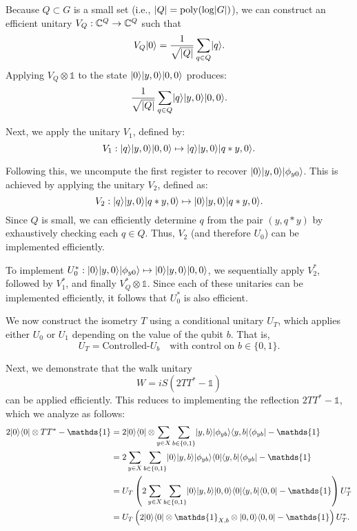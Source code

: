 \documentclass[11pt]{article}
\theoremstyle{definition}
\begin{document}
Because \( Q \subset G \) is a small set (i.e., \( \lvert Q\rvert = \operatorname{poly}(\log \lvert G\rvert) \)), we can construct an efficient unitary \( V_Q : \mathbb{C}^Q \to \mathbb{C}^Q \) such that
\[
V_Q \lvert0\rangle = \frac{1}{\sqrt{\lvert Q\rvert}} \sum_{q \in Q} \lvert q\rangle.
\]
Applying \( V_Q \otimes \mathds{1} \) to the state \( \lvert0\rangle \lvert y, 0\rangle \lvert0, 0\rangle \) produces:
\[
\frac{1}{\sqrt{\lvert Q\rvert}} \sum_{q \in Q} \lvert q\rangle \lvert y, 0\rangle \lvert0, 0\rangle.
\]

Next, we apply the unitary \( V_1 \), defined by:
\[
V_1 : \lvert q\rangle \lvert y, 0\rangle \lvert0, 0\rangle \mapsto \lvert q\rangle \lvert y, 0\rangle \lvert q * y, 0\rangle.
\]

Following this, we uncompute the first register to recover \( \lvert0\rangle \lvert y, 0\rangle \lvert\phi_{y0}\rangle \). This is achieved by applying the unitary \( V_2 \), defined as:
\[
V_2 : \lvert q\rangle \lvert y, 0\rangle \lvert q * y, 0\rangle \mapsto \lvert0\rangle \lvert y, 0\rangle \lvert q * y, 0\rangle.
\]
Since \( Q \) is small, we can efficiently determine \( q \) from the pair \( (y, q * y) \) by exhaustively checking each \( q \in Q \). Thus, \( V_2 \) (and therefore \( U_0 \)) can be implemented efficiently.


To implement \( U_0^* : \lvert0\rangle \lvert y, 0\rangle \lvert\phi_{y0}\rangle \mapsto \lvert0\rangle \lvert y, 0\rangle \lvert0, 0\rangle \), we sequentially apply \( V_2^* \), followed by \( V_1^* \), and finally \( V_Q^* \otimes \mathds{1} \). Since each of these unitaries can be implemented efficiently, it follows that \( U_0^* \) is also efficient.

We now construct the isometry \( T \) using a conditional unitary \( U_T \), which applies either \( U_0 \) or \( U_1 \) depending on the value of the qubit \( b \). That is,
\[
U_T = \text{Controlled-}U_b \quad \text{with control on } b \in \{0,1\}.
\]

Next, we demonstrate that the walk unitary
\[
W = iS(2TT^* - \mathds{1})
\]
can be applied efficiently. This reduces to implementing the reflection \( 2TT^* - \mathds{1} \), which we analyze as follows:
\begin{align*}
2\ket{0}\bra{0} \otimes TT^* - \mathds{1}
&= 2\ket{0}\bra{0} \otimes \sum_{y \in X} \sum_{b \in \{0,1\}} \ket{y,b} \ket{\phi_{yb}} \bra{y,b} \bra{\phi_{yb}} - \mathds{1} \\
&= 2\sum_{y \in X} \sum_{b \in \{0,1\}} \ket{0} \ket{y,b} \ket{\phi_{yb}} \bra{0} \bra{y,b} \bra{\phi_{yb}} - \mathds{1} \\
&= U_T \left( 2 \sum_{y \in X} \sum_{b \in \{0,1\}} \ket{0} \ket{y,b} \ket{0,0} \bra{0} \bra{y,b} \bra{0,0} - \mathds{1} \right) U_T^* \\
&= U_T \left( 2\ket{0}\bra{0} \otimes \mathds{1}_{X,b} \otimes \ket{0,0}\bra{0,0} - \mathds{1} \right) U_T^*.
\end{align*}
\end{document}

